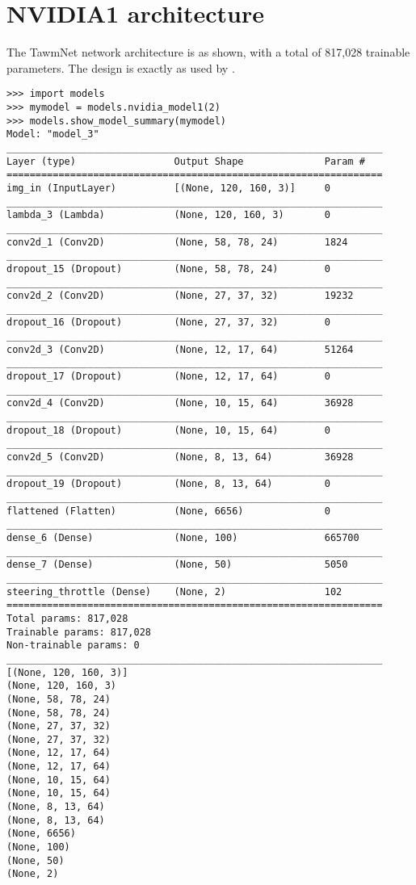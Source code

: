 \section{NVIDIA1 architecture}
\label{arc:nvidia1}
The TawmNet network architecture is as shown, with a total of 817,028 trainable parameters. The design is exactly as used by \cite{SDSandboxSim}.
\begin{verbatim}
>>> import models
>>> mymodel = models.nvidia_model1(2)
>>> models.show_model_summary(mymodel)
Model: "model_3"
_________________________________________________________________
Layer (type)                 Output Shape              Param #   
=================================================================
img_in (InputLayer)          [(None, 120, 160, 3)]     0         
_________________________________________________________________
lambda_3 (Lambda)            (None, 120, 160, 3)       0         
_________________________________________________________________
conv2d_1 (Conv2D)            (None, 58, 78, 24)        1824      
_________________________________________________________________
dropout_15 (Dropout)         (None, 58, 78, 24)        0         
_________________________________________________________________
conv2d_2 (Conv2D)            (None, 27, 37, 32)        19232     
_________________________________________________________________
dropout_16 (Dropout)         (None, 27, 37, 32)        0         
_________________________________________________________________
conv2d_3 (Conv2D)            (None, 12, 17, 64)        51264     
_________________________________________________________________
dropout_17 (Dropout)         (None, 12, 17, 64)        0         
_________________________________________________________________
conv2d_4 (Conv2D)            (None, 10, 15, 64)        36928     
_________________________________________________________________
dropout_18 (Dropout)         (None, 10, 15, 64)        0         
_________________________________________________________________
conv2d_5 (Conv2D)            (None, 8, 13, 64)         36928     
_________________________________________________________________
dropout_19 (Dropout)         (None, 8, 13, 64)         0         
_________________________________________________________________
flattened (Flatten)          (None, 6656)              0         
_________________________________________________________________
dense_6 (Dense)              (None, 100)               665700    
_________________________________________________________________
dense_7 (Dense)              (None, 50)                5050      
_________________________________________________________________
steering_throttle (Dense)    (None, 2)                 102       
=================================================================
Total params: 817,028
Trainable params: 817,028
Non-trainable params: 0
_________________________________________________________________
[(None, 120, 160, 3)]
(None, 120, 160, 3)
(None, 58, 78, 24)
(None, 58, 78, 24)
(None, 27, 37, 32)
(None, 27, 37, 32)
(None, 12, 17, 64)
(None, 12, 17, 64)
(None, 10, 15, 64)
(None, 10, 15, 64)
(None, 8, 13, 64)
(None, 8, 13, 64)
(None, 6656)
(None, 100)
(None, 50)
(None, 2)    
\end{verbatim}

